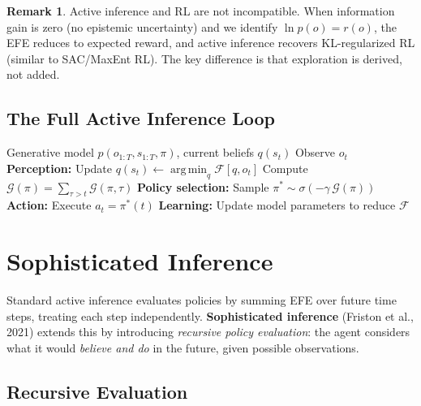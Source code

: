 \documentclass[11pt,a4paper]{article}
\theoremstyle{definition}
\newtheorem{remark}[theorem]{Remark}
\newcommand{\cF}{\mathcal{F}}
\newcommand{\cG}{\mathcal{G}}
\DeclareMathOperator*{\argmin}{arg\,min}
\begin{document}
\begin{remark}
Active inference and RL are not incompatible.  When information gain is zero
(no epistemic uncertainty) and we identify $\ln p(o) = r(o)$, the EFE reduces
to expected reward, and active inference recovers KL-regularized RL (similar to
SAC/MaxEnt RL).  The key difference is that exploration is derived, not added.
\end{remark}

\subsection{The Full Active Inference Loop}

\begin{algorithm}[h]
\caption{Discrete Active Inference Agent (one time step)}
\label{alg:aif}
\begin{algorithmic}[1]
\Require Generative model $p(o_{1:T}, s_{1:T}, \pi)$, current beliefs $q(s_t)$
\State Observe $o_t$
\State \textbf{Perception:} Update $q(s_t) \leftarrow \argmin_q \cF[q, o_t]$
  \State Compute $\cG(\pi) = \sum_{\tau > t} \cG(\pi, \tau)$
\EndFor
\State \textbf{Policy selection:} Sample $\pi^* \sim \sigma(-\gamma\, \cG(\pi))$
\State \textbf{Action:} Execute $a_t = \pi^*(t)$
\State \textbf{Learning:} Update model parameters to reduce $\cF$
\end{algorithmic}
\end{algorithm}


\section{Sophisticated Inference}
\label{sec:sophisticated}

Standard active inference evaluates policies by summing EFE over future time
steps, treating each step independently.  \textbf{Sophisticated inference}
(Friston et al., 2021) extends this by introducing \emph{recursive policy
evaluation}: the agent considers what it would \emph{believe and do} in the
future, given possible observations.

\subsection{Recursive Evaluation}
\end{document}

